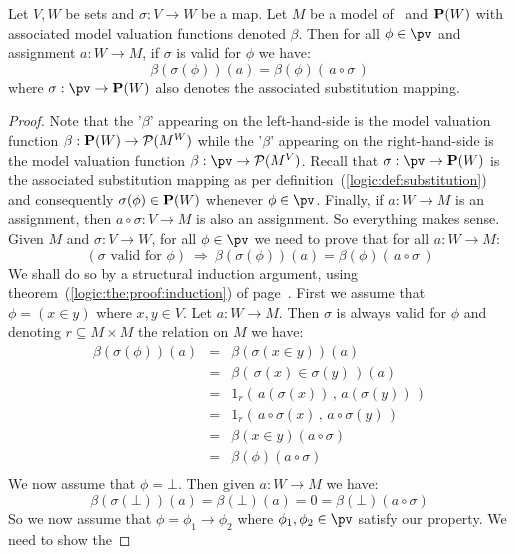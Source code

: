 \begin{prop}\label{logic:prop:FOPL:model:valid:substitution}
Let $V,W$ be sets and $\sigma:V\to W$ be a map. Let $M$ be a model
of \pv\ and ${\bf P}(W)$ with associated model valuation functions
denoted $\beta$. Then for all $\phi\in\pv$ and assignment $a:W\to
M$, if $\sigma$ is valid for $\phi$ we have:
    \[
    \beta(\sigma(\phi))(a)=\beta(\phi)(\,a\circ\sigma\,)
    \]
where $\sigma:\pv\to{\bf P}(W)$ also denotes the associated
substitution mapping.
\end{prop}
\begin{proof}
Note that the '$\beta$' appearing on the left-hand-side is the model
valuation function $\beta:{\bf P}(W)\to{\cal P}(M^{W})$ while the
'$\beta$' appearing on the right-hand-side is the model valuation
function $\beta:\pv\to{\cal P}(M^{V})$. Recall that
$\sigma:\pv\to{\bf P}(W)$ is the associated substitution mapping as
per definition~(\ref{logic:def:substitution}) and consequently
$\sigma(\phi)\in{\bf P}(W)$ whenever $\phi\in\pv$. Finally, if
$a:W\to M$ is an assignment, then $a\circ\sigma:V\to M$ is also an
assignment. So everything makes sense. Given $M$ and $\sigma:V\to
W$, for all $\phi\in\pv$ we need to prove that for all $a:W\to M$:
    \[
    (\mbox{$\sigma$ valid for $\phi$})\ \Rightarrow\
    \beta(\sigma(\phi))(a)=\beta(\phi)(\,a\circ\sigma\,)
    \]
We shall do so by a structural induction argument, using
theorem~(\ref{logic:the:proof:induction}) of
page~\pageref{logic:the:proof:induction}. First we assume that
$\phi=(x\in y)$ where $x,y\in V$. Let $a:W\to M$. Then $\sigma$ is
always valid for $\phi$ and denoting $r\subseteq M\times M$ the
relation on $M$ we have:
    \begin{eqnarray*}
    \beta(\sigma(\phi))(a)&=&\beta(\sigma(x\in y))(a)\\
    &=&\beta(\,\sigma(x)\in\sigma(y)\,)(a)\\
    &=&1_{r}(\,a(\sigma(x))\,,\,a(\sigma(y))\,)\\
    &=&1_{r}(\,a\circ\sigma(x)\,,\,a\circ\sigma(y)\,)\\
    &=&\beta(x\in y)(a\circ\sigma)\\
    &=&\beta(\phi)(a\circ\sigma)\\
    \end{eqnarray*}
We now assume that $\phi=\bot$. Then given $a:W\to M$ we have:
    \[
    \beta(\sigma(\bot))(a)=\beta(\bot)(a)=0=\beta(\bot)(a\circ\sigma)
    \]
So we now assume that $\phi=\phi_{1}\to\phi_{2}$ where
$\phi_{1},\phi_{2}\in\pv$ satisfy our property. We need to show the

\end{proof}
